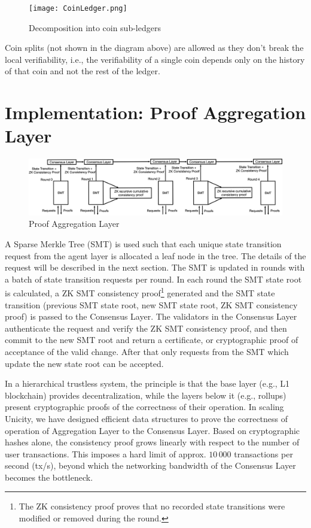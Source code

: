 \documentclass{article}
\begin{document}
\begin{figure}[H]
    \centering
    \texttt{[image: CoinLedger.png]}
    \caption{Decomposition into coin sub-ledgers}
    \label{fig:coinledger}
\end{figure}

Coin splits (not shown in the diagram above) are allowed as they don't break the local verifiability, i.e., the verifiability of a single coin depends only on the history of that coin and not the rest of the ledger.

\section{Implementation: Proof Aggregation Layer}

\begin{figure}[htbp]
    \centering
    \includegraphics[width=1\textwidth]{SMT-Infra2.png}
    \caption{Proof Aggregation Layer}
    \label{fig:SMT}
\end{figure}

A Sparse Merkle Tree (SMT) is used such that each unique state transition request from the agent layer is allocated a leaf node in the tree. The details of the request will be described in the next section. The SMT is updated in rounds with a batch of state transition requests per round. In each round the SMT state root is calculated, a ZK SMT consistency proof\footnote{The ZK consistency proof proves that no recorded state transitions were modified or removed during the round.} generated and the SMT state transition (previous SMT state root, new SMT state root, ZK SMT consistency proof) is passed to the Consensus Layer. The validators in the Consensus Layer authenticate the request and verify the ZK SMT consistency proof, and then commit to the new SMT root and return a certificate, or cryptographic proof of acceptance of the valid change. After that only requests from the SMT which update the new state root can be accepted.

In a hierarchical trustless system, the principle is that the base layer (e.g., L1 blockchain) provides decentralization, while the layers below it (e.g., rollups) present cryptographic proofs of the correctness of their operation. In scaling Unicity, we have designed efficient data structures to prove the correctness of operation of Aggregation Layer to the Consensus Layer. Based on cryptographic hashes alone, the consistency proof grows linearly with respect to the number of user transactions. This imposes a hard limit of approx. $10\,000$ transactions per second (tx/s), beyond which the networking bandwidth of the Consensus Layer becomes the bottleneck.
\end{document}
